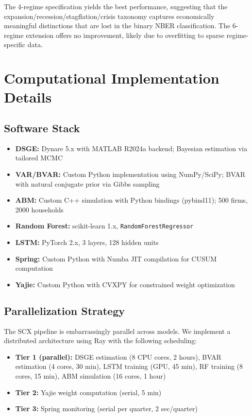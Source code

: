 \documentclass[12pt,a4paper]{article}
\begin{document}
The 4-regime specification yields the best performance, suggesting
that the expansion/recession/stagflation/crisis taxonomy captures
economically meaningful distinctions that are lost in the binary
NBER classification.  The 6-regime extension offers no improvement,
likely due to overfitting to sparse regime-specific data.

\section{Computational Implementation Details}
\label{app:implementation}

\subsection{Software Stack}

\begin{itemize}[leftmargin=*]
    \item \textbf{DSGE:} Dynare 5.x with MATLAB R2024a backend;
    Bayesian estimation via tailored MCMC
    \item \textbf{VAR/BVAR:} Custom Python implementation using
    NumPy/SciPy; BVAR with natural conjugate prior via Gibbs sampling
    \item \textbf{ABM:} Custom C++ simulation with Python bindings
    (pybind11); 500 firms, 2000 households
    \item \textbf{Random Forest:} scikit-learn 1.x,
    \texttt{RandomForestRegressor}
    \item \textbf{LSTM:} PyTorch 2.x, 3 layers, 128 hidden units
    \item \textbf{Spring:} Custom Python with Numba JIT compilation
    for CUSUM computation
    \item \textbf{Yajie:} Custom Python with CVXPY for constrained
    weight optimization
\end{itemize}

\subsection{Parallelization Strategy}

The SCX pipeline is embarrassingly parallel across models.  We
implement a distributed architecture using Ray
\citep{moritz2018ray} with the following scheduling:

\begin{itemize}[leftmargin=*]
    \item \textbf{Tier 1 (parallel):} DSGE estimation (8 CPU cores,
    2 hours), BVAR estimation (4 cores, 30 min), LSTM training
    (GPU, 45 min), RF training (8 cores, 15 min), ABM simulation
    (16 cores, 1 hour)
    \item \textbf{Tier 2:} Yajie weight computation (serial, 5 min)
    \item \textbf{Tier 3:} Spring monitoring (serial per quarter,
    2 sec/quarter)
\end{itemize}
\end{document}
